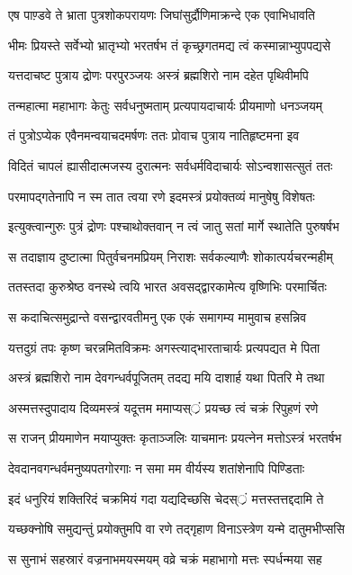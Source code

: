 \twolineshloka
{एष पाण़्डवे ते भ्राता पुत्रशोकपरायणः}
{जिघांसुर्द्रौणिमाक्रन्दे एक एवाभिधावति}


\twolineshloka
{भीमः प्रियस्ते सर्वेभ्यो भ्रातृभ्यो भरतर्षभ}
{तं कृच्छ्रगतमद्य त्वं कस्मान्नाभ्युपपद्यसे}


\twolineshloka
{यत्तदाचष्ट पुत्राय द्रोणः परपुरञ्जयः}
{अस्त्रं ब्रह्मशिरो नाम दहेत पृथिवीमपि}


\twolineshloka
{तन्महात्मा महाभागः केतुः सर्वधनुष्मताम्}
{प्रत्यपायदाचार्यः प्रीयमाणो धनञ्जयम्}


\twolineshloka
{तं पुत्रोऽप्येक एवैनमन्वयाचदमर्षणः}
{ततः प्रोवाच पुत्राय नातिहृष्टमना इव}


\twolineshloka
{विदितं चापलं ह्यासीदात्मजस्य दुरात्मनः}
{सर्वधर्मविदाचार्यः सोऽन्वशासत्सुतं ततः}


\twolineshloka
{परमापद्गतेनापि न स्म तात त्वया रणे}
{इदमस्त्रं प्रयोक्तव्यं मानुषेषु विशेषतः}


\twolineshloka
{इत्युक्त्वान्गुरुः पुत्रं द्रोणः पश्चाथोक्तवान्}
{न त्वं जातु सतां मार्गे स्थातेति पुरुषर्षभ}


\twolineshloka
{स तदाज्ञाय दुष्टात्मा पितुर्वचनमप्रियम्}
{निराशः सर्वकल्याणैः शोकात्पर्यचरन्महीम्}


\twolineshloka
{ततस्तदा कुरुश्रेष्ठ वनस्थे त्वयि भारत}
{अवसद्द्वारकामेत्य वृष्णिभिः परमार्चितः}


\twolineshloka
{स कदाचित्समुद्रान्ते वसन्द्वारवतीमनु}
{एक एकं समागम्य मामुवाच हसन्निव}


\twolineshloka
{यत्तदुग्रं तपः कृष्ण चरन्नमितविक्रमः}
{अगस्त्याद्भारताचार्यः प्रत्यपद्यत मे पिता}


\twolineshloka
{अस्त्रं ब्रह्मशिरो नाम देवगन्धर्वपूजितम्}
{तदद्य मयि दाशार्ह यथा पितरि मे तथा}


\twolineshloka
{अस्मत्तस्दुपादाय दिव्यमस्त्रं यदूत्तम}
{ममाप्यस््रं प्रयच्छ त्वं चक्रं रिपुहणं रणे}


\twolineshloka
{स राजन् प्रीयमाणेन मयाप्युक्तः कृताञ्जलिः}
{याचमानः प्रयत्नेन मत्तोऽस्त्रं भरतर्षभ}


\twolineshloka
{देवदानवगन्धर्वमनुष्यपतगोरगाः}
{न समा मम वीर्यस्य शतांशेनापि पिण्डिताः}


\twolineshloka
{इदं धनुरियं शक्तिरिदं चक्रमियं गदा}
{यद्यदिच्छसि चेदस््रं मत्तस्तत्तद्ददामि ते}


\twolineshloka
{यच्छक्नोषि समुद्यन्तुं प्रयोक्तुमपि वा रणे}
{तद्गृहाण विनाऽस्त्रेण यन्मे दातुमभीप्ससि}


\twolineshloka
{स सुनाभं सहस्रारं वज्रनाभमयस्मयम्}
{वव्रे चक्रं महाभागो मत्तः स्पर्धन्मया सह}


